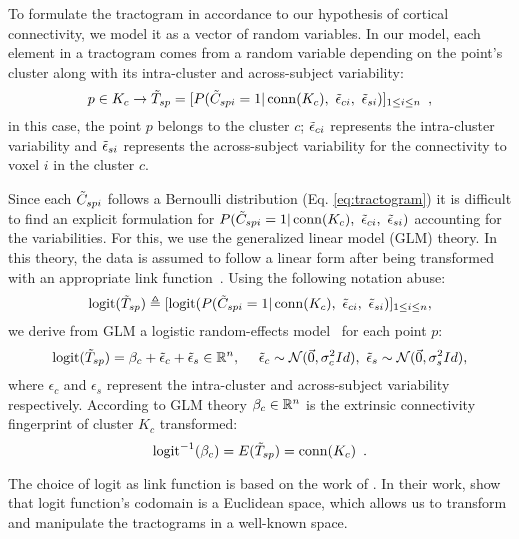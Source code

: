To formulate the tractogram in accordance to our hypothesis of cortical
connectivity, we model it as a vector of random variables. In our
model, each element in a tractogram comes from a random variable depending on
the point's cluster along with its intra-cluster and across-subject variability:
\begin{equation}
    \label{eq:tractogram_rv}
        p \in K_c \rightarrow
        \tilde T_{sp} = 
        [P(\tilde C_{spi}=1 | \operatorname{conn}(K_c), ~\tilde \epsilon_{ci}, ~\tilde \epsilon_{si})]_{1 \leq i \leq n}
        \enspace ,
\end{equation}
%
in this case, the point $p$ belongs to the cluster $c$;  $\tilde \epsilon_{ci}$ 
represents the intra-cluster variability and $\tilde \epsilon_{si}$ represents the
across-subject variability for the connectivity to voxel $i$ in the cluster $c$. 

Since each $\tilde C_{spi}$ follows a Bernoulli distribution (Eq. \ref{eq:tractogram})
it is difficult to find an explicit formulation for 
$P(\tilde C_{spi} = 1 | \operatorname{conn}(K_c),~\tilde \epsilon_{ci}, ~\tilde \epsilon_{si})$ 
accounting for the variabilities. For this, we use the generalized linear
model (GLM) theory. In this theory, the data is assumed to follow a linear form
after being transformed with an appropriate link function~\citep{McCullagh1989}.
Using the following notation abuse:
%
\begin{equation}
    \label{eq:not_abuse}
    \operatorname{logit}(\tilde T_{sp}) \triangleq  [\operatorname{logit}(P(\tilde C_{spi}=1 | \operatorname{conn}(K_c), ~\tilde \epsilon_{ci}, ~\tilde \epsilon_{si})]_{1  \leq i \leq n},
\end{equation}
\noindent
%
we derive from GLM a logistic random-effects model~\citep{Pendergast1996} for
each point $p$:
%
\begin{equation}
    \label{eq:ran_eff_model}
    \operatorname{logit}(\tilde T_{sp}) = \beta_{c} + \tilde \epsilon_{c} + \tilde \epsilon_{s} \in \mathbb{R}^n,
    \quad
    ~ \tilde \epsilon_{c} \sim \mathcal{N}(\vec 0, \sigma_c^2 Id),
    ~ \tilde \epsilon_{s} \sim \mathcal{N}(\vec 0, \sigma_s^2 Id),
\end{equation}
%
where $\epsilon_{c}$ and $\epsilon_{s}$ represent the intra-cluster and 
across-subject variability respectively. According to GLM theory 
$\beta_c \in \mathbb{R}^n$ is the extrinsic connectivity fingerprint of cluster $K_c$
transformed: 
%
\begin{equation}
    \operatorname{logit}^{-1}(\beta_c) = E(\tilde T_{sp}) = \operatorname{conn}(K_c) \enspace.
\end{equation}

The choice of logit as link function is based on the work of \citet{Pohl2007}.
In their work, \citet{Pohl2007} show that logit function's codomain is a
Euclidean space, which allows us to transform and manipulate the tractograms 
in a well-known space.
%
